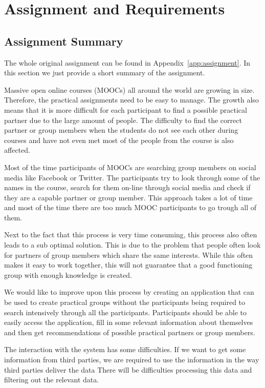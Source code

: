 \chapter{Assignment and Requirements}
\label{sec:requirements}

\section{Assignment Summary}
The whole original assignment can be found in Appendix~\ref{app:assignment}. In this section we just provide a short summary of the assignment. 

Massive open online courses (MOOCs) all around the world are growing in size. 
Therefore, the practical assignments need to be easy to manage.
The growth also means that it is more difficult for each participant to find a possible practical partner due to the large amount of people.
The difficulty to find the correct partner or group members when the students do not see each other during courses and have not even met most of the people from the course is also affected.

Most of the time participants of MOOCs are searching group members on social media like Facebook or Twitter.
The participants try to look through some of the names in the course, search for them on-line through social media and check if they are a capable partner or group member.
This approach takes a lot of time and most of the time there are too much MOOC participants to go trough all of them.

Next to the fact that this process is very time consuming, this process also often leads to a sub optimal solution.
This is due to the problem that people often look for partners of group members which share the same interests.
While this often makes it easy to work together, this will not guarantee that a good functioning group with enough knowledge is created.

We would like to improve upon this process by creating an application that can be used to create practical groups without the participants being required to search intensively through all the participants.
Participants should be able to easily access the application, fill in some relevant information about themselves and then get recommendations of possible practical partners or group members.

The interaction with the system has some difficulties.
If we want to get some information from third parties, we are required to use the information in the way third parties deliver the data
There will be difficulties processing this data and filtering out the relevant data.

